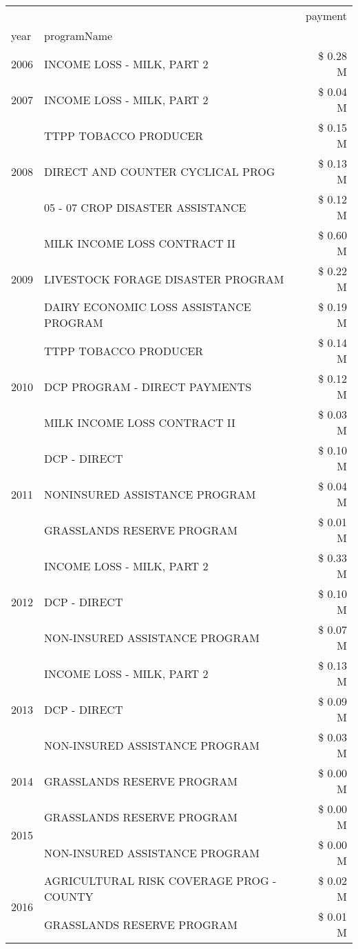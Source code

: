 \begin{tabular}{llr}
\toprule
 &  & payment \\
year & programName &  \\
\midrule
2006 & INCOME LOSS - MILK, PART 2 & \$ 0.28 M \\
\cline{1-3}
2007 & INCOME LOSS - MILK, PART 2 & \$ 0.04 M \\
\cline{1-3}
\multirow[t]{3}{*}{2008} & TTPP TOBACCO PRODUCER & \$ 0.15 M \\
 & DIRECT AND COUNTER CYCLICAL PROG & \$ 0.13 M \\
 & 05 - 07 CROP DISASTER ASSISTANCE & \$ 0.12 M \\
\cline{1-3}
\multirow[t]{3}{*}{2009} & MILK INCOME LOSS CONTRACT II & \$ 0.60 M \\
 & LIVESTOCK FORAGE DISASTER  PROGRAM & \$ 0.22 M \\
 & DAIRY ECONOMIC LOSS ASSISTANCE PROGRAM & \$ 0.19 M \\
\cline{1-3}
\multirow[t]{3}{*}{2010} & TTPP TOBACCO PRODUCER & \$ 0.14 M \\
 & DCP PROGRAM - DIRECT PAYMENTS & \$ 0.12 M \\
 & MILK INCOME LOSS CONTRACT II & \$ 0.03 M \\
\cline{1-3}
\multirow[t]{3}{*}{2011} & DCP - DIRECT & \$ 0.10 M \\
 & NONINSURED ASSISTANCE PROGRAM & \$ 0.04 M \\
 & GRASSLANDS RESERVE PROGRAM & \$ 0.01 M \\
\cline{1-3}
\multirow[t]{3}{*}{2012} & INCOME LOSS - MILK, PART 2 & \$ 0.33 M \\
 & DCP - DIRECT & \$ 0.10 M \\
 & NON-INSURED ASSISTANCE PROGRAM & \$ 0.07 M \\
\cline{1-3}
\multirow[t]{3}{*}{2013} & INCOME LOSS - MILK, PART 2 & \$ 0.13 M \\
 & DCP - DIRECT & \$ 0.09 M \\
 & NON-INSURED ASSISTANCE PROGRAM & \$ 0.03 M \\
\cline{1-3}
2014 & GRASSLANDS RESERVE PROGRAM & \$ 0.00 M \\
\cline{1-3}
\multirow[t]{2}{*}{2015} & GRASSLANDS RESERVE PROGRAM & \$ 0.00 M \\
 & NON-INSURED ASSISTANCE PROGRAM & \$ 0.00 M \\
\cline{1-3}
\multirow[t]{3}{*}{2016} & AGRICULTURAL RISK COVERAGE PROG - COUNTY & \$ 0.02 M \\
 & GRASSLANDS RESERVE PROGRAM & \$ 0.01 M \\

\end{tabular}
